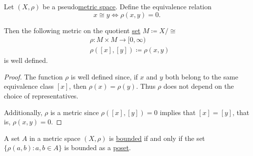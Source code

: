 \begin{proposition}\label{thm:pseudometric_to_metric}
  Let \( (X, \rho) \) be a pseudo\hyperref[def:metric_space]{metric space}. Define the equivalence relation
  \begin{equation*}
    x \cong y \iff \rho(x, y) = 0.
  \end{equation*}

  Then the following metric on the quotient \hyperref[thm:equivalence_partition]{set} \( M \coloneqq X / \cong \)
  \begin{align*}
    &\rho: M \times M \to [0, \infty) \\
    &\rho([x], [y]) \coloneqq \rho(x, y)
  \end{align*}
  is well defined.
\end{proposition}
\begin{proof}
  The function \( \rho \) is well defined since, if \( x \) and \( y \) both belong to the same equivalence class \( [x] \), then \( \rho(x) = \rho(y) \). Thus \( \rho \) does not depend on the choice of representatives.

  Additionally, \( \rho \) is a metric since \( \rho([x], [y]) = 0 \) implies that \( [x] = [y] \), that is, \( \rho(x, y) = 0 \).
\end{proof}

\begin{proposition}\label{remark:bounded_set_metric_order_equivalence}
  A set \( A \) in a metric space \( (X, \rho) \) is \hyperref[def:metric_space/bounded_set]{bounded} if and only if the set \( \{ \rho(a, b) \colon a, b \in A \} \) is bounded as a \hyperref[def:preordered_set/bounded_set]{poset}.
\end{proposition}

